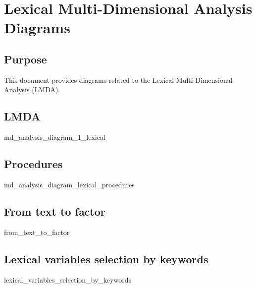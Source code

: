 \section{Lexical Multi-Dimensional Analysis Diagrams}

\subsection{Purpose}

This document provides diagrams related to the Lexical Multi-Dimensional Analysis (LMDA).

\subsection{LMDA}

{md_analysis_diagram_1_lexical}

\subsection{Procedures}

{md_analysis_diagram_lexical_procedures}

\subsection{From text to factor}

{from_text_to_factor}

\subsection{Lexical variables selection by keywords}

{lexical_variables_selection_by_keywords}
